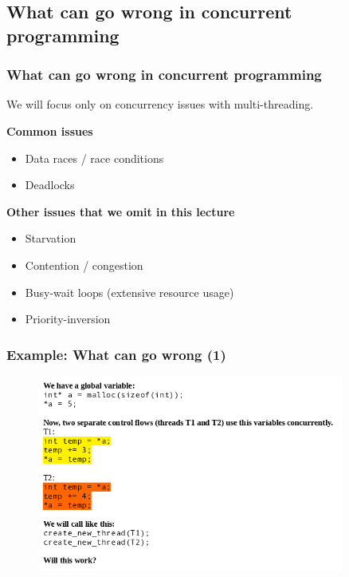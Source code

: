 \documentclass{beamer}
\begin{document}
%
%
%
\begin{frame}
\section{What can go wrong in concurrent programming}
\frametitle{What can go wrong in concurrent programming}
We will focus only on concurrency issues with multi-threading.\\\vspace{3mm}

\textbf{Common issues}
\begin{itemize}
\item Data races / race conditions
\item Deadlocks
\end{itemize}\vspace{3mm}

\textbf{Other issues that we omit in this lecture}
\begin{itemize}
\item Starvation
\item Contention / congestion
\item Busy-wait loops (extensive resource usage)
\item Priority-inversion
\end{itemize}

\end{frame}



%
%
%
\begin{frame}
\frametitle{Example: What can go wrong (1)}
\begin{figure}
\includegraphics[width=0.9\textwidth]{images/what-can-go-wrong-1.png}
\end{figure}
\end{frame}
\end{document}
